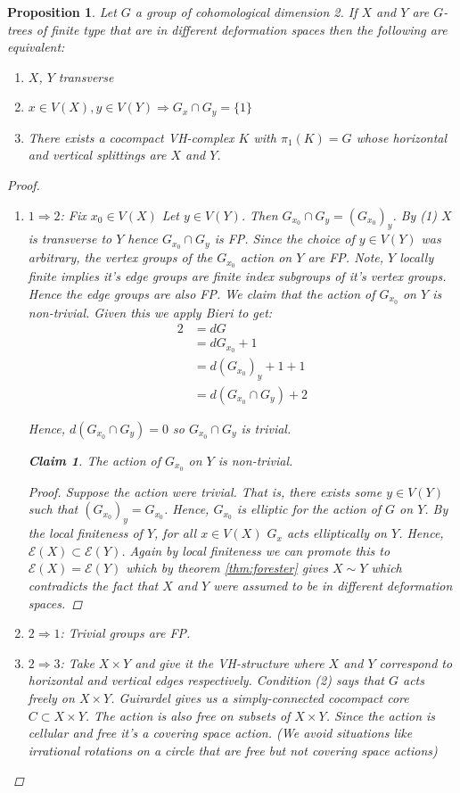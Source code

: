 \documentclass{article}
\theoremstyle{mystyle}
\newtheorem{pro}{Proposition}
\newtheorem*{claim*}{Claim}
\theoremstyle{remark}
\begin{document}
\begin{pro}
 Let $G$ a group of cohomological dimension 2. If $X$ and $Y$ are $G$-trees of finite type that are in different deformation spaces then the following are equivalent:
\begin{enumerate}
    \item $X$, $Y$ transverse
    \item $x \in V(X), y\in V(Y)\Longrightarrow G_x\cap G_y = \{1\}$
    \item There exists a cocompact VH-complex $K$ with $\pi_1(K) = G$ whose horizontal and vertical splittings are $X$ and $Y$.
\end{enumerate}
\begin{proof}
\begin{enumerate}
    \item $1\Rightarrow 2$: Fix $x_0 \in V(X)$ Let $y\in V(Y)$. Then $G_{x_0} \cap G_y = (G_{x_0})_y$. By (1) $X$ is transverse to $Y$ hence $G_{x_0}\cap G_y$ is FP. Since the choice of $y\in V(Y)$ was arbitrary, the vertex groups of the $G_{x_0}$ action on $Y$ are FP. Note, $Y$ locally finite implies it's edge groups are finite index subgroups of it's vertex groups. Hence the edge groups are also FP. We claim that the action of $G_{x_0}$ on $Y$ is non-trivial. Given this we apply Bieri to get:
    \begin{align*}
        2 &= dG\\
          &= dG_{x_0}+1\\
          &= d( G_{x_0} )_y+1+1\\
          &= d(G_{x_0}\cap G_y)+2
    \end{align*}
    
    Hence, $d(G_{x_0}\cap G_y)=0$ so $G_{x_0}\cap G_y$ is trivial.
    
    \begin{claim*}
    The action of $G_{x_0}$ on $Y$ is non-trivial.
    \begin{proof}
    Suppose the action were trivial. That is, there exists some $y\in V(Y)$ such that $(G_{x_0})_y=G_{x_0}$. Hence, $G_{x_0}$ is elliptic for the action of $G$ on $Y$. By the local finiteness of $Y$, for all $x\in V(X)$ $G_x$ acts elliptically on $Y$. Hence, $\mathcal{E}(X)\subset \mathcal{E}(Y)$. Again by local finiteness we can promote this to $\mathcal{E}(X) = \mathcal{E}(Y)$ which by theorem \ref{thm:forester} gives $X \sim Y$ which contradicts the fact that $X$ and $Y$ were assumed to be in different deformation spaces.
    \end{proof}
    \end{claim*}
    \item $2\Rightarrow 1$: Trivial groups are FP.
    \item $2\Rightarrow 3$: Take $X \times Y$ and give it the VH-structure where $X$ and $Y$ correspond to horizontal and vertical edges respectively. Condition (2) says that $G$ acts freely on $X\times Y$. Guirardel gives us a simply-connected cocompact core $C \subset X \times Y$. The action is also free on subsets of $X \times Y$. Since the action is cellular and free it's a covering space action. (We avoid situations like irrational rotations on a circle that are free but not covering space actions) 
    

\end{enumerate}
\end{proof}
\end{pro}
\end{document}
